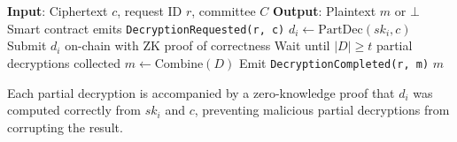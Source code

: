 \begin{algorithm}[t]
\caption{Threshold Decryption on Zoo}
\label{alg:threshold}
\begin{algorithmic}[1]
\STATE \textbf{Input}: Ciphertext $c$, request ID $r$, committee $C$
\STATE \textbf{Output}: Plaintext $m$ or $\bot$
\STATE Smart contract emits \texttt{DecryptionRequested(r, c)}
    \STATE $d_i \leftarrow \text{PartDec}(sk_i, c)$
    \STATE Submit $d_i$ on-chain with ZK proof of correctness
\ENDFOR
\STATE Wait until $|D| \geq t$ partial decryptions collected
\STATE $m \leftarrow \text{Combine}(D)$
\STATE Emit \texttt{DecryptionCompleted(r, m)}
\RETURN $m$
\end{algorithmic}
\end{algorithm}

Each partial decryption is accompanied by a zero-knowledge proof that $d_i$ was computed correctly from $sk_i$ and $c$, preventing malicious partial decryptions from corrupting the result.

